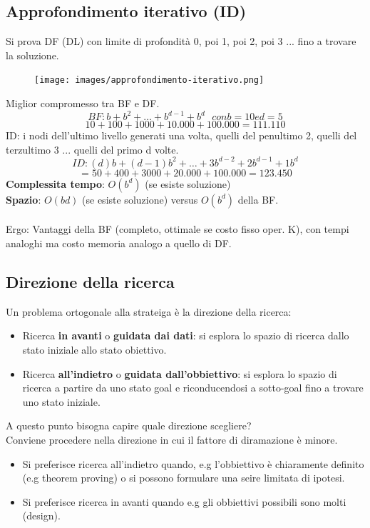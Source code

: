 \subsection{Approfondimento iterativo (ID)}
Si prova DF (DL) con limite di profondità 0, poi 1, poi 2, poi 3 ... fino
a trovare la soluzione.
\begin{figure}[h!]
	\centering
	\texttt{[image: images/approfondimento-iterativo.png]}
\end{figure}

\hspace{-15pt}Miglior compromesso tra BF e DF.
$$BF: b + b^2 + \dots + b^{d-1} + b^d \:\:\: con b=10 e d=5$$
$$10 + 100 + 1000 + 10.000 + 100.000 = 111.110$$
ID: i nodi dell'ultimo livello generati una volta, quelli del penultimo 2, quelli
del terzultimo 3 ... quelli del primo d volte.
$$ID: (d)b + (d-1)b^2 + \dots + 3b^{d-2} + 2b^{d-1} + 1b^d$$
$$= 50 + 400 + 3000 + 20.000 + 100.000 = 123.450$$
\textbf{Complessita tempo}: $O(b^d)$ (se esiste soluzione)\\
\textbf{Spazio}: $O(bd)$ (se esiste soluzione) versus $O(b^d)$ della BF.\\\\
Ergo: Vantaggi della BF (completo, ottimale se costo fisso oper. K),
con tempi analoghi ma costo memoria analogo a quello di DF.

\subsection{Direzione della ricerca}
Un problema ortogonale alla strateiga è la direzione della ricerca:
\begin{itemize}
	\item Ricerca \textbf{in avanti} o \textbf{guidata dai dati}: si esplora lo spazio di ricerca dallo stato iniziale allo stato obiettivo.
	\item Ricerca \textbf{all'indietro} o \textbf{guidata dall'obbiettivo}: si esplora lo spazio di ricerca a partire da uno stato goal e riconducendosi a sotto-goal fino a trovare uno stato iniziale. 
\end{itemize}
A questo punto bisogna capire quale direzione scegliere?\\
Conviene procedere nella direzione in cui il fattore di diramazione è minore.
\begin{itemize}
	\item Si preferisce ricerca all'indietro quando, e.g l'obbiettivo è chiaramente definito (e.g theorem proving) o si possono formulare una seire limitata di ipotesi.
	\item Si preferisce ricerca in avanti quando e.g gli obbiettivi possibili sono molti (design).
\end{itemize}
